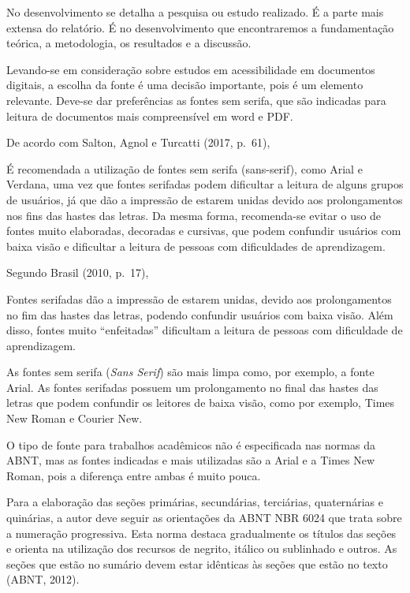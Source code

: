No desenvolvimento se detalha a pesquisa ou estudo realizado. É a parte mais
extensa do relatório. É no desenvolvimento que encontraremos a fundamentação
teórica, a metodologia, os resultados e a discussão.

Levando-se em consideração sobre estudos em acessibilidade em documentos
digitais, a escolha da fonte é uma decisão importante, pois é um elemento
relevante. Deve-se dar preferências as fontes sem serifa, que são indicadas
para leitura de documentos mais compreensível em word e PDF.

De acordo com Salton, Agnol e Turcatti (2017, p.~61),

\begin{citacaolonga}
É recomendada a utilização de fontes sem serifa (sans-serif), como Arial e
Verdana, uma vez que fontes serifadas podem dificultar a leitura de alguns
grupos de usuários, já que dão a impressão de estarem unidas devido aos
prolongamentos nos fins das hastes das letras. Da mesma forma, recomenda-se
evitar o uso de fontes muito elaboradas, decoradas e cursivas, que podem
confundir usuários com baixa visão e dificultar a leitura de pessoas com
dificuldades de aprendizagem.
\end{citacaolonga}

Segundo Brasil (2010, p.~17),

\begin{citacaolonga}
Fontes serifadas dão a impressão de estarem unidas, devido aos prolongamentos
no fim das hastes das letras, podendo confundir usuários com baixa visão. Além
disso, fontes muito ``enfeitadas'' dificultam a leitura de pessoas com
dificuldade de aprendizagem.
\end{citacaolonga}

As fontes sem serifa (\textit{Sans Serif}) são mais limpa como, por exemplo, a
fonte Arial. As fontes serifadas possuem um prolongamento no final das hastes
das letras que podem confundir os leitores de baixa visão, como por exemplo,
Times New Roman e Courier New.

O tipo de fonte para trabalhos acadêmicos não é especificada nas normas da
ABNT, mas as fontes indicadas e mais utilizadas são a Arial e a Times New
Roman, pois a diferença entre ambas é muito pouca.

Para a elaboração das seções primárias, secundárias, terciárias, quaternárias
e quinárias, a autor deve seguir as orientações da ABNT NBR 6024 que trata
sobre a numeração progressiva. Esta norma destaca gradualmente os títulos das
seções e orienta na utilização dos recursos de negrito, itálico ou sublinhado
e outros. As seções que estão no sumário devem estar idênticas às seções que
estão no texto (ABNT, 2012).

